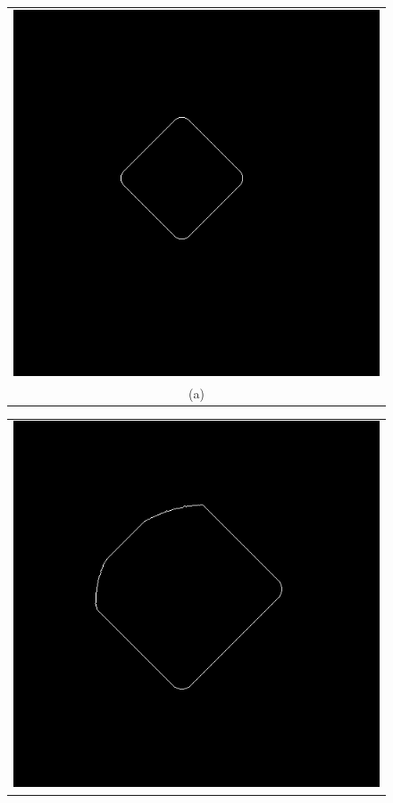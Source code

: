 \begin{figure}[h!]
\centering
\begin{minipage}{.49\textwidth}
\begin{tabular}{c}
\includegraphics[width=.9\textwidth]{results/2D/circleZero700} \\
(a)
\end{tabular}
\end{minipage}
\begin{minipage}{.49\textwidth}
\begin{tabular}{c}
\includegraphics[width=.9\textwidth]{results/2D/circleZero1200} \\

\end{tabular}
\end{minipage}
\end{figure}
